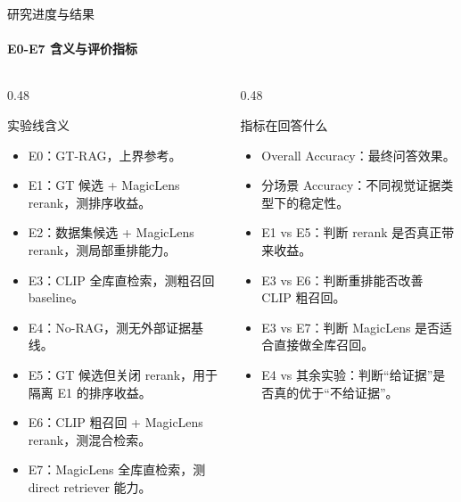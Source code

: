 \documentclass[10pt,aspectratio=169,]{beamer}
\begin{document}
\begin{frame}{研究进度与结果}
	\framesubtitle{E0-E7 含义与评价指标}
	\begin{columns}[T]
		\begin{column}{0.48\textwidth}
			\begin{block}{实验线含义}
				\begin{itemize}
					\item E0：GT-RAG，上界参考。
					\item E1：GT 候选 + MagicLens rerank，测排序收益。
					\item E2：数据集候选 + MagicLens rerank，测局部重排能力。
					\item E3：CLIP 全库直检索，测粗召回 baseline。
					\item E4：No-RAG，测无外部证据基线。
					\item E5：GT 候选但关闭 rerank，用于隔离 E1 的排序收益。
					\item E6：CLIP 粗召回 + MagicLens rerank，测混合检索。
					\item E7：MagicLens 全库直检索，测 direct retriever 能力。
				\end{itemize}
			\end{block}
		\end{column}
		\begin{column}{0.48\textwidth}
			\begin{alertblock}{指标在回答什么}
				\begin{itemize}
					\item Overall Accuracy：最终问答效果。
					\item 分场景 Accuracy：不同视觉证据类型下的稳定性。
					\item E1 vs E5：判断 rerank 是否真正带来收益。
					\item E3 vs E6：判断重排能否改善 CLIP 粗召回。
					\item E3 vs E7：判断 MagicLens 是否适合直接做全库召回。
					\item E4 vs 其余实验：判断“给证据”是否真的优于“不给证据”。
				\end{itemize}
			\end{alertblock}
		\end{column}
	\end{columns}
\end{frame}
\end{document}

